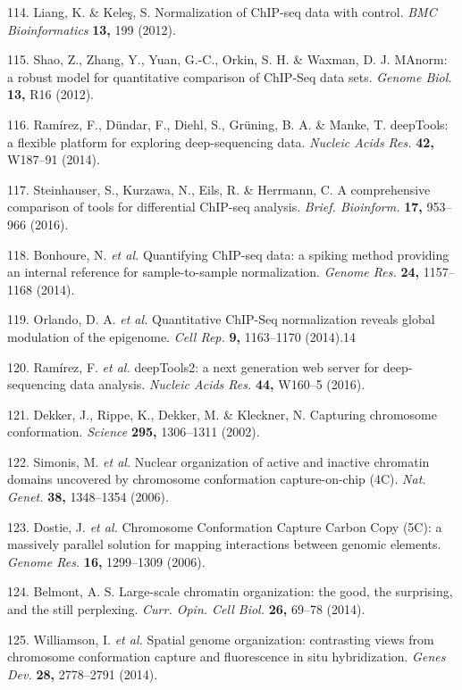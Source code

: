 \documentclass[11pt,twoside]{MPIthesis}
\theoremstyle{definition}
\theoremstyle{definition}
\theoremstyle{definition}
\theoremstyle{remark}
\begin{document}
114. Liang, K. \& Keleş, S. Normalization of ChIP-seq data with control.
\emph{BMC Bioinformatics} \textbf{13,} 199 (2012).

115. Shao, Z., Zhang, Y., Yuan, G.-C., Orkin, S. H. \& Waxman, D. J.
MAnorm: a robust model for quantitative comparison of ChIP-Seq data
sets. \emph{Genome Biol.} \textbf{13,} R16 (2012).

116. Ramírez, F., Dündar, F., Diehl, S., Grüning, B. A. \& Manke, T.
deepTools: a flexible platform for exploring deep-sequencing data.
\emph{Nucleic Acids Res.} \textbf{42,} W187--91 (2014).

117. Steinhauser, S., Kurzawa, N., Eils, R. \& Herrmann, C. A
comprehensive comparison of tools for differential ChIP-seq analysis.
\emph{Brief. Bioinform.} \textbf{17,} 953--966 (2016).

118. Bonhoure, N. \emph{et al.} Quantifying ChIP-seq data: a spiking
method providing an internal reference for sample-to-sample
normalization. \emph{Genome Res.} \textbf{24,} 1157--1168 (2014).

119. Orlando, D. A. \emph{et al.} Quantitative ChIP-Seq normalization
reveals global modulation of the epigenome. \emph{Cell Rep.} \textbf{9,}
1163--1170 (2014).14

120. Ramírez, F. \emph{et al.} deepTools2: a next generation web server
for deep-sequencing data analysis. \emph{Nucleic Acids Res.}
\textbf{44,} W160--5 (2016).

121. Dekker, J., Rippe, K., Dekker, M. \& Kleckner, N. Capturing
chromosome conformation. \emph{Science} \textbf{295,} 1306--1311 (2002).

122. Simonis, M. \emph{et al.} Nuclear organization of active and
inactive chromatin domains uncovered by chromosome conformation
capture-on-chip (4C). \emph{Nat. Genet.} \textbf{38,} 1348--1354 (2006).

123. Dostie, J. \emph{et al.} Chromosome Conformation Capture Carbon
Copy (5C): a massively parallel solution for mapping interactions
between genomic elements. \emph{Genome Res.} \textbf{16,} 1299--1309
(2006).

124. Belmont, A. S. Large-scale chromatin organization: the good, the
surprising, and the still perplexing. \emph{Curr. Opin. Cell Biol.}
\textbf{26,} 69--78 (2014).

125. Williamson, I. \emph{et al.} Spatial genome organization:
contrasting views from chromosome conformation capture and fluorescence
in situ hybridization. \emph{Genes Dev.} \textbf{28,} 2778--2791 (2014).
\end{document}
